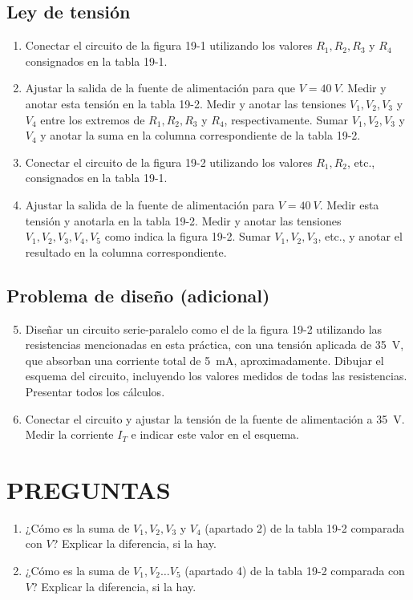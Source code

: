 \documentclass{article}
\begin{document}
\subsection*{Ley de tensión}
\begin{enumerate}
    \item Conectar el circuito de la figura 19-1 utilizando los valores $R_1, R_2, R_3$ y $R_4$ consignados en la tabla 19-1.
    \item Ajustar la salida de la fuente de alimentación para que $V = \SI{40}{V}$. Medir y anotar esta tensión en la tabla 19-2. Medir y anotar las tensiones $V_1, V_2, V_3$ y $V_4$ entre los extremos de $R_1, R_2, R_3$ y $R_4$, respectivamente. Sumar $V_1, V_2, V_3$ y $V_4$ y anotar la suma en la columna correspondiente de la tabla 19-2.
    \item Conectar el circuito de la figura 19-2 utilizando los valores $R_1, R_2$, etc., consignados en la tabla 19-1.
    \item Ajustar la salida de la fuente de alimentación para $V = \SI{40}{V}$. Medir esta tensión y anotarla en la tabla 19-2. Medir y anotar las tensiones $V_1, V_2, V_3, V_4, V_5$ como indica la figura 19-2. Sumar $V_1, V_2, V_3$, etc., y anotar el resultado en la columna correspondiente.
\end{enumerate}

\subsection*{Problema de diseño (adicional)}
\begin{enumerate}
    \setcounter{enumi}{4}
    \item Diseñar un circuito serie-paralelo como el de la figura 19-2 utilizando las resistencias mencionadas en esta práctica, con una tensión aplicada de \SI{35}{V}, que absorban una corriente total de \SI{5}{mA}, aproximadamente. Dibujar el esquema del circuito, incluyendo los valores medidos de todas las resistencias. Presentar todos los cálculos.
    \item Conectar el circuito y ajustar la tensión de la fuente de alimentación a \SI{35}{V}. Medir la corriente $I_T$ e indicar este valor en el esquema.
\end{enumerate}

\section*{PREGUNTAS}
\begin{enumerate}
    \item ¿Cómo es la suma de $V_1, V_2, V_3$ y $V_4$ (apartado 2) de la tabla 19-2 comparada con $V$? Explicar la diferencia, si la hay.
    \item ¿Cómo es la suma de $V_1, V_2 \dots V_5$ (apartado 4) de la tabla 19-2 comparada con $V$? Explicar la diferencia, si la hay.
\end{enumerate}
\end{document}
